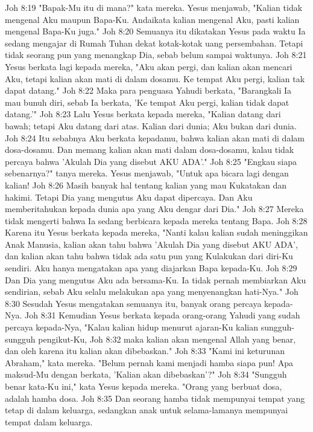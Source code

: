 Joh 8:19  "Bapak-Mu itu di mana?" kata mereka. Yesus menjawab, "Kalian tidak mengenal Aku maupun Bapa-Ku. Andaikata kalian mengenal Aku, pasti kalian mengenal Bapa-Ku juga."
Joh 8:20  Semuanya itu dikatakan Yesus pada waktu Ia sedang mengajar di Rumah Tuhan dekat kotak-kotak uang persembahan. Tetapi tidak seorang pun yang menangkap Dia, sebab belum sampai waktunya.
Joh 8:21  Yesus berkata lagi kepada mereka, "Aku akan pergi, dan kalian akan mencari Aku, tetapi kalian akan mati di dalam dosamu. Ke tempat Aku pergi, kalian tak dapat datang."
Joh 8:22  Maka para penguasa Yahudi berkata, "Barangkali Ia mau bunuh diri, sebab Ia berkata, 'Ke tempat Aku pergi, kalian tidak dapat datang.'"
Joh 8:23  Lalu Yesus berkata kepada mereka, "Kalian datang dari bawah; tetapi Aku datang dari atas. Kalian dari dunia; Aku bukan dari dunia.
Joh 8:24  Itu sebabnya Aku berkata kepadamu, bahwa kalian akan mati di dalam dosa-dosamu. Dan memang kalian akan mati dalam dosa-dosamu, kalau tidak percaya bahwa 'Akulah Dia yang disebut AKU ADA'."
Joh 8:25  "Engkau siapa sebenarnya?" tanya mereka. Yesus menjawab, "Untuk apa bicara lagi dengan kalian!
Joh 8:26  Masih banyak hal tentang kalian yang mau Kukatakan dan hakimi. Tetapi Dia yang mengutus Aku dapat dipercaya. Dan Aku memberitahukan kepada dunia apa yang Aku dengar dari Dia."
Joh 8:27  Mereka tidak mengerti bahwa Ia sedang berbicara kepada mereka tentang Bapa.
Joh 8:28  Karena itu Yesus berkata kepada mereka, "Nanti kalau kalian sudah meninggikan Anak Manusia, kalian akan tahu bahwa 'Akulah Dia yang disebut AKU ADA', dan kalian akan tahu bahwa tidak ada satu pun yang Kulakukan dari diri-Ku sendiri. Aku hanya mengatakan apa yang diajarkan Bapa kepada-Ku.
Joh 8:29  Dan Dia yang mengutus Aku ada bersama-Ku. Ia tidak pernah membiarkan Aku sendirian, sebab Aku selalu melakukan apa yang menyenangkan hati-Nya."
Joh 8:30  Sesudah Yesus mengatakan semuanya itu, banyak orang percaya kepada-Nya.
Joh 8:31  Kemudian Yesus berkata kepada orang-orang Yahudi yang sudah percaya kepada-Nya, "Kalau kalian hidup menurut ajaran-Ku kalian sungguh-sungguh pengikut-Ku,
Joh 8:32  maka kalian akan mengenal Allah yang benar, dan oleh karena itu kalian akan dibebaskan."
Joh 8:33  "Kami ini keturunan Abraham," kata mereka. "Belum pernah kami menjadi hamba siapa pun! Apa maksud-Mu dengan berkata, 'Kalian akan dibebaskan'?"
Joh 8:34  "Sungguh benar kata-Ku ini," kata Yesus kepada mereka. "Orang yang berbuat dosa, adalah hamba dosa.
Joh 8:35  Dan seorang hamba tidak mempunyai tempat yang tetap di dalam keluarga, sedangkan anak untuk selama-lamanya mempunyai tempat dalam keluarga.
